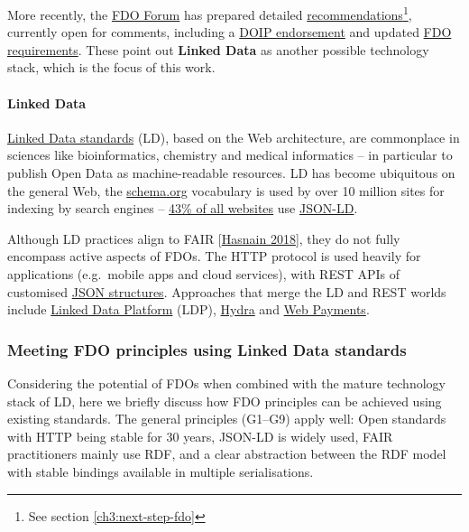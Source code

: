 More recently, the \href{https://fairdo.org/}{FDO Forum} has prepared
detailed
\href{https://drive.google.com/drive/u/0/folders/1-SbZk7enOqjy2Rf57PMB-CQW7qMOUXgO}{recommendations}\footnote{See section \vref{ch3:next-step-fdo}},
currently open for comments, including a
\href{https://docs.google.com/document/d/10ESWe-m0ex7fIW0ZYOYeVg6gAcIaBKyO3W-Vg8tXzdw/edit\#}{DOIP
endorsement} and updated
\href{https://docs.google.com/document/d/1-4_yGRrIcgdMIwaFvHyUt6lxDdfzGpqLUCEihE0vJ-g/edit\#heading=h.gjdgxs}{FDO
requirements}. These point out \textbf{Linked Data} as another possible
technology stack, which is the focus of this work.

\paragraph{Linked Data}
\label{ch2:linked-data}

\href{https://www.w3.org/standards/semanticweb/data}{Linked Data
standards} (LD), based on the Web architecture, are commonplace in
sciences like bioinformatics, chemistry and medical informatics -- in
particular to publish Open Data as machine-readable resources. LD has
become ubiquitous on the general Web, the
\href{https://schema.org/}{schema.org} vocabulary is used by over 10
million sites for indexing by search engines --
\href{https://w3techs.com/technologies/details/da-jsonld}{43\% of all
websites} use \href{https://json-ld.org/}{JSON-LD}.

Although LD practices align to FAIR
{[}\href{https://doi.org/10.1007/978-3-319-98192-5_60}{Hasnain 2018}{]},
they do not fully encompass active aspects of FDOs. The HTTP protocol is
used heavily for applications (e.g.~mobile apps and cloud services),
with REST APIs of customised \href{https://json-schema.org/}{JSON
structures}. Approaches that merge the LD and REST worlds include
\href{https://www.w3.org/TR/ldp/}{Linked Data Platform} (LDP),
\href{https://www.hydra-cg.com/}{Hydra} and
\href{https://www.w3.org/TR/webpayments-http-messages/}{Web Payments}.


\subsubsection{Meeting FDO principles using Linked Data
standards}\label{ch2:meeting-fdo-principles-using-linked-data-standards}

Considering the potential of FDOs when combined with the mature
technology stack of LD, here we briefly discuss how FDO principles can
be achieved using existing standards. The general principles (G1--G9)
apply well: Open standards with HTTP being stable for 30 years, JSON-LD
is widely used, FAIR practitioners mainly use RDF, and a clear
abstraction between the RDF model with stable bindings available in
multiple serialisations.

